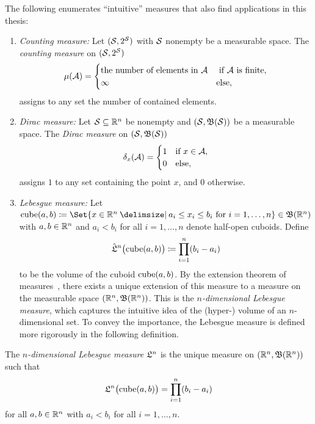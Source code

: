 The following enumerates \enquote{intuitive} measures that also find applications in this thesis:
\begin{enumerate}
	\item \emph{Counting measure:}
		Let \( (\mathcal{S}, 2^{\mathcal{S}}) \) with \( \mathcal{S} \) nonempty be a measurable space.
		The \emph{counting measure} on \( (\mathcal{S}, 2^{\mathcal{S}}) \)
		\begin{equation}
			\Measure(\mathcal{A}) = \begin{cases}
				\text{the number of elements in}\ \mathcal{A} &\ \text{if}\ \mathcal{A}\ \text{is finite}, \\
				\infty & \text{else,}
			\end{cases}
		\end{equation}
		assigns to any set the number of contained elements.
	\item \emph{Dirac measure:}
		Let \( \mathcal{S} \subseteq \mathbb{R}^n \) be nonempty and \( (\mathcal{S}, \mathfrak{B}(\mathcal{S})) \) be a measurable space.
		The \emph{Dirac measure} on \( (\mathcal{S}, \mathfrak{B}(\mathcal{S})) \)
		\begin{equation}
			\delta_{x}(\mathcal{A}) = \begin{cases}
				\num{1} & \text{if } x \in \mathcal{A},\\
				\num{0} & \text{else},
			\end{cases}
		\end{equation}
		assigns \( \num{1} \) to any set containing the point \( x \), and \( \num{0} \) otherwise.
	\item \emph{Lebesgue measure:} Let \( \cube(a, b) \coloneqq \Set{x\in\R^n \given a_i \leq x_i \leq b_i\ \text{for}\ i=\num{1},\dotsc,n} \in \BorelSigma{\R^n} \) with \( a, b \in \mathbb{R}^n \) and \( a_i < b_i \) for all \( i = \num{1}, \dotsc, n \) denote half-open cuboids.
		Define
		\begin{equation}
			\hat{\mathfrak{L}}^n \bigl(\operatorname{cube}(a, b)\bigr) \coloneqq \prod_{i=\num{1}}^n (b_i - a_i)
		\end{equation}
		to be the volume of the cuboid \( \operatorname{cube}(a, b) \).
		By the extension theorem of measures~\cite{Klenke2014}, there exists a unique extension of this measure to a measure on the measurable space \( (\mathbb{R}^n, \mathfrak{B}(\mathbb{R}^n)) \).
		This is the \emph{\( n \)-dimensional Lebesgue measure}, which captures the intuitive idea of the (hyper-) volume of an \( n \)-dimensional set.
		To convey the importance, the Lebesgue measure is defined more rigorously in the following definition.
\end{enumerate}
\begin{definition}%
	\label{def:lebesgue measure}
	The \emph{\( n \)-dimensional Lebesgue measure} \( \mathfrak{L}^n \) is the unique measure on \( (\mathbb{R}^n, \mathfrak{B}(\mathbb{R}^n)) \) such that
	\begin{equation}
		\mathfrak{L}^n\bigl(\operatorname{cube}(a, b)\bigr) = \prod_{i=\num{1}}^n (b_i - a_i)
	\end{equation}
	for all \( a, b \in \mathbb{R}^n \) with \( a_i < b_i \) for all \( i = \num{1}, \dotsc, n \).
\end{definition}

